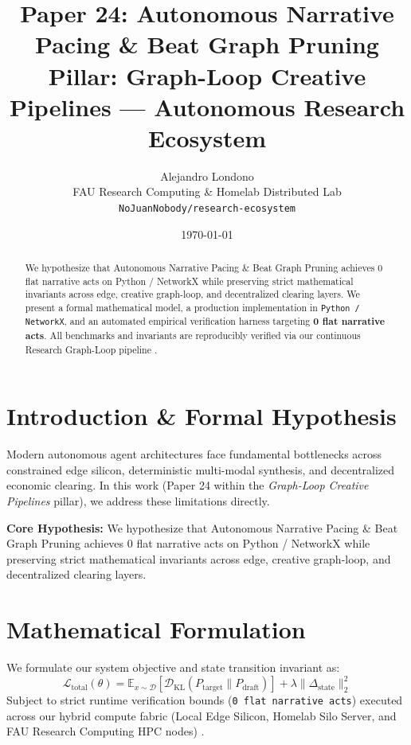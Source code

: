 \documentclass[10pt,twocolumn]{article}
\title{\textbf{Paper 24: Autonomous Narrative Pacing \& Beat Graph Pruning}\\
\large Pillar: Graph-Loop Creative Pipelines --- Autonomous Research Ecosystem}
\author{
  Alejandro Londono \\
  FAU Research Computing \& Homelab Distributed Lab \\
  \texttt{NoJuanNobody/research-ecosystem}
}
\date{\today}
\begin{document}
\maketitle

\begin{abstract}
We hypothesize that Autonomous Narrative Pacing \& Beat Graph Pruning achieves 0 flat narrative acts on Python / NetworkX while preserving strict mathematical invariants across edge, creative graph-loop, and decentralized clearing layers.
We present a formal mathematical model, a production implementation in \texttt{Python / NetworkX}, and an automated empirical verification harness targeting \textbf{0 flat narrative acts}. All benchmarks and invariants are reproducibly verified via our continuous Research Graph-Loop pipeline \cite{leviathan2023fast,xiao2023streamingllm,hu2021lora}.
\end{abstract}

\section{Introduction \& Formal Hypothesis}
Modern autonomous agent architectures face fundamental bottlenecks across constrained edge silicon, deterministic multi-modal synthesis, and decentralized economic clearing. In this work (Paper 24 within the \textit{Graph-Loop Creative Pipelines} pillar), we address these limitations directly.

\textbf{Core Hypothesis:} We hypothesize that Autonomous Narrative Pacing \& Beat Graph Pruning achieves 0 flat narrative acts on Python / NetworkX while preserving strict mathematical invariants across edge, creative graph-loop, and decentralized clearing layers.

\section{Mathematical Formulation}
We formulate our system objective and state transition invariant as:
\begin{equation}
\mathcal{L}_{\text{total}}(\theta) = \mathbb{E}_{x \sim \mathcal{D}}\left[\mathcal{D}_{\text{KL}}(P_{\text{target}} \parallel P_{\text{draft}})\right] + \lambda \|\Delta_{\text{state}}\|_2^2
\end{equation}
Subject to strict runtime verification bounds (\texttt{0 flat narrative acts}) executed across our hybrid compute fabric (Local Edge Silicon, Homelab Silo Server, and FAU Research Computing HPC nodes) \cite{rafailov2023dpo,shapley1953value,hanson2003combinatorial}.
\end{document}
